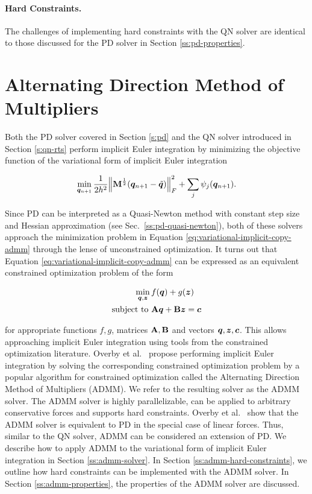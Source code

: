 \paragraph{Hard Constraints.}
The challenges of implementing hard constraints with the QN solver are identical to those discussed for the PD solver in Section \ref{ss:pd-properties}.

\section{Alternating Direction Method of Multipliers}\label{s:admm}
Both the PD solver covered in Section \ref{s:pd} and the QN solver introduced in Section \ref{s:qn-rts} perform implicit Euler integration by minimizing the objective 
function of the variational form of implicit Euler integration

\begin{equation}\label{eq:variational-implicit-copy-admm}
    \min_{\bm{q}_{n+1}} \frac{1}{2h^2} \norm{\mathbf{M}^{\frac{1}{2}}(\bm{q}_{n+1} - \tilde{\bm{q}})}^2_F + \sum_j \psi_j(\bm{q}_{n+1}).
\end{equation}

\noindent Since PD can be interpreted as a Quasi-Newton method with constant step size and Hessian approximation (see Sec.\ \ref{ss:pd-quasi-newton}), both of these 
solvers approach the minimization problem in Equation \ref{eq:variational-implicit-copy-admm} through the lense of unconstrained optimization. It turns out that 
Equation \ref{eq:variational-implicit-copy-admm} can be expressed as an equivalent constrained optimization problem of the form 

\begin{align}\label{eq:admm-constrained-problem}
    \min_{\bm{q}, \bm{z}}\, &f(\bm{q}) + g(\bm{z}) \\ 
    \text{subject to } &\mathbf{A}\bm{q} + \mathbf{B}\bm{z} = \bm{c}
\end{align}

\noindent for appropriate functions $f, g$, matrices $\mathbf{A}, \mathbf{B}$ and vectors $\bm{q}, \bm{z}, \bm{c}$. This allows approaching implicit 
Euler integration using tools from the constrained optimization literature. Overby et al.\ \cite{overby2017} propose performing implicit Euler integration by solving the 
corresponding constrained optimization problem by a popular algorithm for constrained optimization called the Alternating Direction Method of Multipliers (ADMM). We refer 
to the resulting solver as the ADMM solver. The ADMM solver is highly parallelizable, can be applied to arbitrary conservative forces and supports hard constraints. 
Overby et al.\ \cite{overby2017} show that the ADMM solver is equivalent to PD in the special case of linear forces. Thus, similar to the QN solver, ADMM can be considered 
an extension of PD. We describe how to apply ADMM to the variational form of implicit Euler integration in Section \ref{ss:admm-solver}. In Section \ref{ss:admm-hard-constraints}, 
we outline how hard constraints can be implemented with the ADMM solver. In Section \ref{ss:admm-properties}, the properties of the ADMM solver are discussed. 

